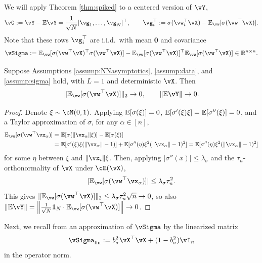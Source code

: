 We will apply Theorem \ref{thm:spiked} to a centered version of $\vY$,
\[\vG:=\vY-\E \vY=\frac{1}{\sqrt{N}}[\vg_1,\ldots,\vg_N]^\top,
\qquad \vg_i^\top:=\sigma(\vw_i^\top {\vX})-\E_{\vw}[\sigma(\vw^\top {\vX})].\]
Note that these rows $\vg_i^\top$ are i.i.d.\ with mean $\mathbf{0}$ and covariance
\begin{equation}\label{eq:Sigma_CK}
	\vSigma:=\E_{\vw}[\sigma(\vw^\top \vX)^\top\sigma(\vw^\top
\vX)]-\E_{\vw}[\sigma(\vw^\top \vX)]^\top\E_{\vw}[\sigma(\vw^\top
\vX)]\in\R^{n\times n}.
\end{equation}

\begin{lemma}\label{lemm:expect_rows}
Suppose Assumptions \ref{assump:NNasymptotics}, \ref{assump:data}, and
\ref{assump:sigma} hold, with $L=1$ and deterministic $\vX$. Then
\[\|\E_{\vw}[\sigma(\vw^\top \vX)]\|_2 \to 0, \qquad \|\E\vY\| \to 0.\]
\end{lemma}
\begin{proof}
Denote $\xi \sim \cN(0,1)$. Applying $\mathbb{E}[\sigma(\xi)]=0$,
$\mathbb{E}[\sigma'(\xi)\xi]=\mathbb{E}[\sigma''(\xi)]=0$, and a
Taylor approximation of $\sigma$, for any $\alpha \in [n]$,
	\begin{align*}
	\E_{\vw}[\sigma(\vw^\top\vx_\alpha)]=~&\E[\sigma(\norm{\vx_\alpha}\xi)]-\E[\sigma(\xi)]\\
	= ~&
\E[\sigma'(\xi)\xi(\norm{\vx_\alpha}-1)]+\E[\sigma''(\eta)\xi^2(\norm{\vx_\alpha}-1)^2]=\E[\sigma''(\eta)\xi^2(\norm{\vx_\alpha}-1)^2]
	\end{align*}
for some $\eta$ between $\xi$ and $\norm{\vx_i}\xi$.
Then, applying $|\sigma''(x)| \leq \lambda_\sigma$ and the
$\tau_n$-orthonormality of $\vX$ under $\cE(\vX)$,
\[|\E_{\vw}[\sigma(\vw^\top\vx_\alpha)]| \leq \lambda_\sigma \tau_n^2.\]
This gives $\|\E_{\vw}[\sigma(\vw^\top\vX)]\|_2 \leq \lambda_\sigma\tau_n^2\sqrt{n} \to 0$,
so also
$\norm{\E \vY}=\norm{\frac{1}{\sqrt{N}}\bI_N \cdot
\E_{\vw}[\sigma(\vw^\top \vX)]} \to 0$.
\end{proof}

Next, we recall from \cite{wang2021deformed} 
an approximation of $\vSigma$ by the linearized matrix
\begin{equation}\label{def:Phi0}
	\vSigma_{\mathrm{lin}}:=b_\sigma^2\vX^\top \vX+(1-b_\sigma^2 )\vI_n
\end{equation}
in the operator norm.


